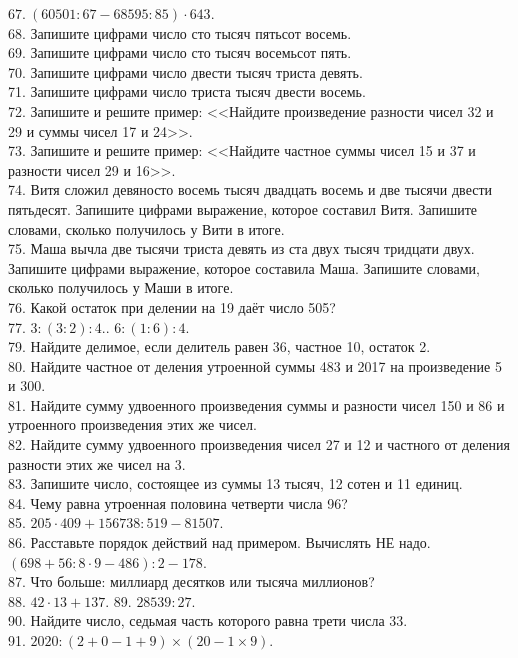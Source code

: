\documentclass[12pt]{article}
\begin{document}
$67.\ (60501:67-68595:85)\cdot643.$\\
68. Запишите цифрами число сто тысяч пятьсот восемь.\\
69. Запишите цифрами число сто тысяч восемьсот пять.\\
70. Запишите цифрами число двести тысяч триста девять.\\
71. Запишите цифрами число триста тысяч двести восемь.\\
72. Запишите и решите пример: <<Найдите произведение разности чисел 32 и 29 и суммы чисел 17 и 24>>.\\
73. Запишите и решите пример: <<Найдите частное суммы чисел 15 и 37 и разности чисел 29 и 16>>.\\
74. Витя сложил девяносто восемь тысяч двадцать восемь и две тысячи двести пятьдесят. Запишите цифрами выражение, которое составил Витя. Запишите словами, сколько получилось у Вити в итоге.\\
75. Маша вычла две тысячи триста девять из ста двух тысяч тридцати двух. Запишите цифрами выражение, которое составила Маша. Запишите словами, сколько получилось у Маши в итоге.\\
76. Какой остаток при делении на 19 даёт число 505?\\
77. $3:(3:2):4.$\qquad  {}. $6:(1:6):4.$\\
79. Найдите делимое, если делитель равен 36, частное 10, остаток 2.\\
80. Найдите частное от деления утроенной суммы 483 и 2017 на произведение 5 и 300.\\
81. Найдите сумму удвоенного произведения суммы и разности чисел 150 и 86 и утроенного произведения этих же чисел.\\
82. Найдите сумму удвоенного произведения чисел 27 и 12 и частного от деления разности этих же чисел на 3.\\
83. Запишите число, состоящее из суммы 13 тысяч, 12 сотен и 11 единиц.\\
84. Чему равна утроенная половина четверти числа 96?\\
85. $205\cdot409+156738:519-81507.$\\
86. Расставьте порядок действий над примером. Вычислять НЕ надо.\\
$(698+56:8\cdot9-486):2-178.$\\
87. Что больше: миллиард десятков или тысяча миллионов?\\
88. $42\cdot13+137.$ 89. $28539:27.$\\ 90. Найдите число, седьмая часть которого равна трети числа 33. \\  91. $2020:(2+0-1+9) \times (20-1 \times 9).$\qquad
\end{document}
